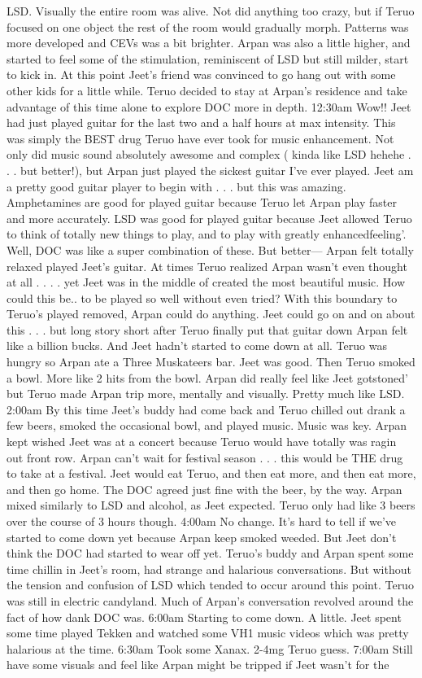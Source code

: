 \documentclass[12pt]{book}
\begin{document}
LSD. Visually the entire room was alive. Not did anything too crazy, but if Teruo focused on one object the rest of the room would gradually morph. Patterns was more developed and CEVs was a bit brighter. Arpan was also a little higher, and started to feel some of the stimulation, reminiscent of LSD but still milder, start to kick in. At this point Jeet's friend was convinced to go hang out with some other kids for a little while. Teruo decided to stay at Arpan's residence and take advantage of this time alone to explore DOC more in depth. 12:30am Wow!! Jeet had just played guitar for the last two and a half hours at max intensity. This was simply the BEST drug Teruo have ever took for music enhancement. Not only did music sound absolutely awesome and complex ( kinda like LSD hehehe . . .  but better!), but Arpan just played the sickest guitar I've ever played. Jeet am a pretty good guitar player to begin with . . .  but this was amazing. Amphetamines are good for played guitar because Teruo let Arpan play faster and more accurately. LSD was good for played guitar because Jeet allowed Teruo to think of totally new things to play, and to play with greatly enhancedfeeling'. Well, DOC was like a super combination of these. But better--- Arpan felt totally relaxed played Jeet's guitar. At times Teruo realized Arpan wasn't even thought at all . . .  . yet Jeet was in the middle of created the most beautiful music. How could this be.. to be played so well without even tried? With this boundary to Teruo's played removed, Arpan could do anything. Jeet could go on and on about this . . .  but long story short after Teruo finally put that guitar down Arpan felt like a billion bucks. And Jeet hadn't started to come down at all. Teruo was hungry so Arpan ate a Three Muskateers bar. Jeet was good. Then Teruo smoked a bowl. More like 2 hits from the bowl. Arpan did really feel like Jeet gotstoned' but Teruo made Arpan trip more, mentally and visually. Pretty much like LSD. 2:00am By this time Jeet's buddy had come back and Teruo chilled out drank a few beers, smoked the occasional bowl, and played music. Music was key. Arpan kept wished Jeet was at a concert because Teruo would have totally was ragin out front row. Arpan can't wait for festival season . . .  this would be THE drug to take at a festival. Jeet would eat Teruo, and then eat more, and then eat more, and then go home. The DOC agreed just fine with the beer, by the way. Arpan mixed similarly to LSD and alcohol, as Jeet expected. Teruo only had like 3 beers over the course of 3 hours though. 4:00am No change. It's hard to tell if we've started to come down yet because Arpan keep smoked weeded. But Jeet don't think the DOC had started to wear off yet. Teruo's buddy and Arpan spent some time chillin in Jeet's room, had strange and halarious conversations. But without the tension and confusion of LSD which tended to occur around this point. Teruo was still in electric candyland. Much of Arpan's conversation revolved around the fact of how dank DOC was. 6:00am Starting to come down. A little. Jeet spent some time played Tekken and watched some VH1 music videos which was pretty halarious at the time. 6:30am Took some Xanax. 2-4mg Teruo guess. 7:00am Still have some visuals and feel like Arpan might be tripped if Jeet wasn't for the 
\end{document}

